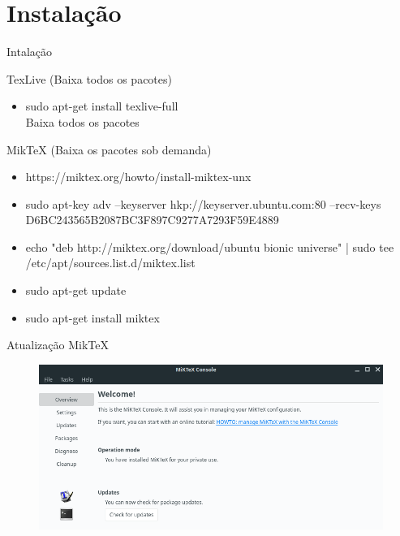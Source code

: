 \documentclass{beamer}
\begin{document}
\section{Instalação}
\begin{frame}{Intalação}

	\begin{block}{TexLive (Baixa todos os pacotes)}
		\begin{itemize}
			\item sudo apt-get install texlive-full
			\\Baixa todos os pacotes  
		\end{itemize}
	\end{block}
	
	
	\begin{block}{MikTeX (Baixa os pacotes sob demanda)}
		\begin{itemize}
			\item https://miktex.org/howto/install-miktex-unx
			
			\item sudo apt-key adv --keyserver hkp://keyserver.ubuntu.com:80 --recv-keys D6BC243565B2087BC3F897C9277A7293F59E4889
			
			\item echo "deb http://miktex.org/download/ubuntu bionic universe" | sudo tee /etc/apt/sources.list.d/miktex.list
			
			\item sudo apt-get update
			
			\item sudo apt-get install miktex
		\end{itemize}
	\end{block}
	

\end{frame}


\begin{frame}{Atualização MikTeX}

	\begin{figure}[!htb]
		\centering
		\includegraphics[scale=.38]{miktex.png}
	\end{figure}

\end{frame}
\end{document}
